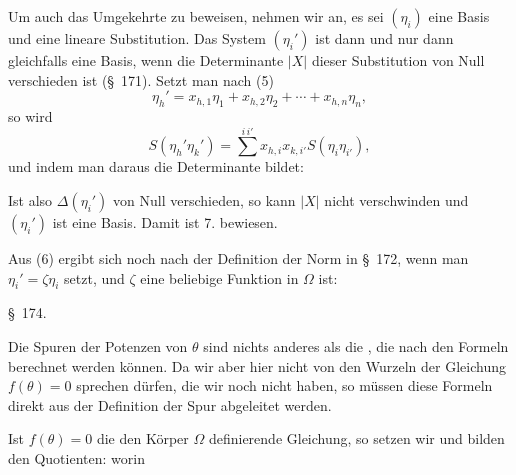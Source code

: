 Um auch das Umgekehrte zu beweisen, nehmen wir an, es sei $(\eta_i)$ eine Basis und
eine lineare Substitution. Das System $(\eta_i')$ ist dann und nur dann gleichfalls eine Basis, wenn die Determinante $|X|$ dieser Substitution von Null verschieden ist (\S\ 171). Setzt man nach (5)
\[
\eta_h' = x_{h,1}\eta_1 + x_{h,2}\eta_2 + \cdots + x_{h,n}\eta_n,
\]
so wird
\[
S(\eta_h'\eta_k') = \sum^{i\,i'} x_{h,i} x_{k,i'} S(\eta_i \eta_{i'}),
\]
und indem man daraus die Determinante bildet:

Ist also $\Delta(\eta_i')$ von Null verschieden, so kann $|X|$ nicht verschwinden und $(\eta_i')$ ist eine Basis. Damit ist 7. bewiesen.

Aus (6) ergibt sich noch nach der Definition der Norm in \S\ 172, wenn man $\eta_i' = \zeta\eta_i$ setzt, und $\zeta$ eine beliebige Funktion in $\Omega$ ist:

\S\ 174. 

Die Spuren der Potenzen von $\theta$
sind nichts anderes als die , die nach den  Formeln berechnet werden können. Da wir aber hier nicht von den \glqq Wurzeln\grqq{} der Gleichung $f(\theta) = 0$ sprechen dürfen, die wir noch nicht haben, so müssen diese Formeln direkt aus der Definition der Spur abgeleitet werden.

Ist $f(\theta) = 0$ die den Körper $\Omega$ definierende Gleichung, so setzen wir
und bilden den Quotienten:
worin
